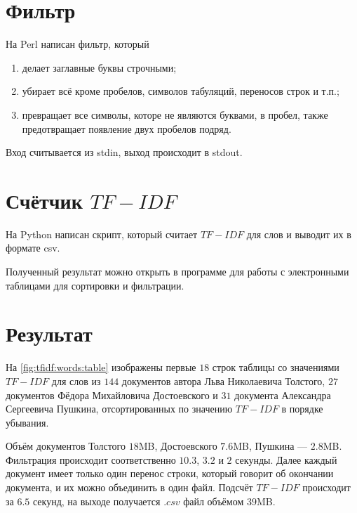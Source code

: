 \section{Фильтр}
На Perl написан фильтр, который
\begin{enumerate}
  \item делает заглавные буквы строчными;
  \item убирает всё кроме пробелов, символов табуляций, переносов строк и т.п.;
  \item превращает все символы, которе не являются буквами, в пробел, также
    предотвращает появление двух пробелов подряд.
\end{enumerate}

Вход считывается из stdin, выход происходит в stdout.

\lstset{inputencoding=utf8, extendedchars=\true}


\section{Счётчик $TF-IDF$}
На Python написан скрипт, который считает $TF-IDF$ для слов
и выводит их в формате csv.

Полученный результат можно открыть в программе для работы
с электронными таблицами для сортировки и фильтрации.

\lstset{inputencoding=utf8, extendedchars=\true}


\section{Результат}
На \ref{fig:tfidf:words:table} изображены первые $18$ строк таблицы
со значениями $TF-IDF$ для слов из $144$ документов автора
Льва Николаевича Толстого, $27$ документов Фёдора Михайловича Достоевского
и $31$ документа Александра Сергеевича Пушкина, отсортированных по значению
$TF-IDF$ в порядке убывания.

Объём документов Толстого $18$MB, Достоевского $7.6$MB, Пушкина --- $2.8$MB.
Фильтрация происходит соответственно $10.3$, $3.2$ и $2$ секунды.
Далее каждый документ имеет только один перенос строки,
который говорит об окончании документа, и их можно объединить в один файл.
Подсчёт $TF-IDF$ происходит за $6.5$ секунд,
на выходе получается $.csv$ файл объёмом $39$MB.


